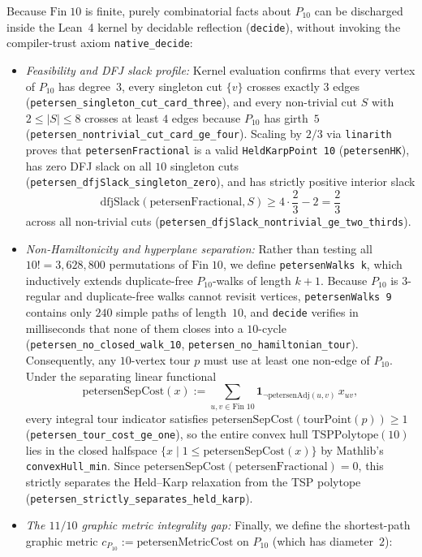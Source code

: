 Because $\mathrm{Fin}\;10$ is finite, purely combinatorial facts about $P_{10}$ can be discharged inside the Lean~4 kernel by decidable reflection (\texttt{decide}), without invoking the compiler-trust axiom \texttt{native\_decide}:
\begin{itemize}
  \item \emph{Feasibility and DFJ slack profile:} Kernel evaluation confirms that every vertex of $P_{10}$ has degree~$3$, every singleton cut $\{v\}$ crosses exactly $3$ edges (\texttt{petersen\_singleton\_cut\_card\_three}), and every non-trivial cut $S$ with $2 \le |S| \le 8$ crosses at least $4$ edges because $P_{10}$ has girth~$5$ (\texttt{petersen\_nontrivial\_cut\_card\_ge\_four}). Scaling by $2/3$ via \texttt{linarith} proves that \texttt{petersenFractional} is a valid \texttt{HeldKarpPoint 10} (\texttt{petersenHK}), has zero DFJ slack on all $10$ singleton cuts (\texttt{petersen\_dfjSlack\_singleton\_zero}), and has strictly positive interior slack
  \[
    \mathrm{dfjSlack}(\mathrm{petersenFractional}, S) \ge 4 \cdot \frac{2}{3} - 2 = \frac{2}{3}
  \]
  across all non-trivial cuts (\texttt{petersen\_dfjSlack\_nontrivial\_ge\_two\_thirds}).
  \item \emph{Non-Hamiltonicity and hyperplane separation:} Rather than testing all $10! = 3{,}628{,}800$ permutations of $\mathrm{Fin}\;10$, we define \texttt{petersenWalks k}, which inductively extends duplicate-free $P_{10}$-walks of length $k+1$. Because $P_{10}$ is $3$-regular and duplicate-free walks cannot revisit vertices, \texttt{petersenWalks 9} contains only $240$ simple paths of length~$10$, and \texttt{decide} verifies in milliseconds that none of them closes into a $10$-cycle (\texttt{petersen\_no\_closed\_walk\_10}, \texttt{petersen\_no\_hamiltonian\_tour}). Consequently, any $10$-vertex tour $p$ must use at least one non-edge of $P_{10}$. Under the separating linear functional
  \[
    \mathrm{petersenSepCost}(x) := \sum_{u,v \in \mathrm{Fin}\;10} \mathbf{1}_{\neg\mathrm{petersenAdj}(u,v)}\, x_{uv},
  \]
  every integral tour indicator satisfies $\mathrm{petersenSepCost}(\mathrm{tourPoint}(p)) \ge 1$ (\texttt{petersen\_tour\_cost\_ge\_one}), so the entire convex hull $\mathrm{TSPPolytope}(10)$ lies in the closed halfspace $\{x \mid 1 \le \mathrm{petersenSepCost}(x)\}$ by Mathlib's \texttt{convexHull\_min}. Since $\mathrm{petersenSepCost}(\mathrm{petersenFractional}) = 0$, this strictly separates the Held--Karp relaxation from the TSP polytope (\texttt{petersen\_strictly\_separates\_held\_karp}).
  \item \emph{The $11/10$ graphic metric integrality gap:} Finally, we define the shortest-path graphic metric $c_{P_{10}} := \mathrm{petersenMetricCost}$ on $P_{10}$ (which has diameter~$2$):

\end{itemize}
